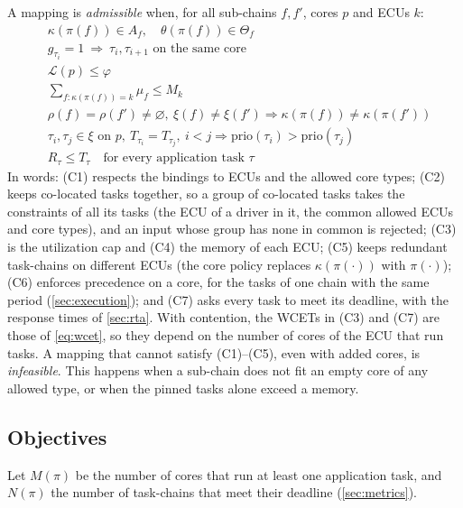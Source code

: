 A mapping is \emph{admissible} when, for all sub-chains $f,f'$, cores $p$
and ECUs $k$:
\begin{align}
&\kappa(\pi(f))\in A_f,\quad \theta(\pi(f))\in\Theta_f \tag{C1}\label{c:allowed}\\
&g_{\tau_i}=1\ \Rightarrow\ \tau_i,\tau_{i+1}\text{ on the same core} \tag{C2}\label{c:coloc}\\
&\mathcal{L}(p)\le\varphi \tag{C3}\label{c:load}\\
&\textstyle\sum_{f:\kappa(\pi(f))=k}\mu_f\le M_k \tag{C4}\label{c:memory}\\
&\rho(f)=\rho(f')\ne\varnothing,\ \xi(f)\ne\xi(f')\Rightarrow
	\kappa(\pi(f))\ne\kappa(\pi(f')) \tag{C5}\label{c:replica}\\
&\tau_i,\tau_j\in\xi\text{ on }p,\ T_{\tau_i}=T_{\tau_j},\ i<j\Rightarrow
	\mathrm{prio}(\tau_i)>\mathrm{prio}(\tau_j) \tag{C6}\label{c:prec}\\
&R_\tau\le T_\tau\quad\text{for every application task }\tau \tag{C7}\label{c:sched}
\end{align}
In words: (C1) respects the bindings to ECUs and the allowed core types;
(C2) keeps co-located tasks together, so a group of co-located tasks
takes the constraints of all its tasks (the ECU of a driver in it, the
common allowed ECUs and core types), and an input whose group has none in
common is rejected; (C3) is the utilization cap and
(C4) the memory of each ECU; (C5) keeps redundant task-chains on different
ECUs (the core policy replaces $\kappa(\pi(\cdot))$ with $\pi(\cdot)$);
(C6) enforces precedence on a core, for the tasks of one chain with the
same period (\cref{sec:execution}); and (C7) asks
every task to meet its deadline, with the response times of
\cref{sec:rta}. With contention, the WCETs in (C3) and (C7) are those of
\cref{eq:wcet}, so they depend on the number of cores of the ECU that run
tasks. A mapping that cannot satisfy (C1)--(C5), even with added cores, is
\emph{infeasible}. This happens when a sub-chain does not fit an empty
core of any allowed type, or when the pinned tasks alone exceed a memory.

\subsection{Objectives}

Let $M(\pi)$ be the number of cores that run at least one application task,
and $N(\pi)$ the number of task-chains that meet their deadline
(\cref{sec:metrics}).

